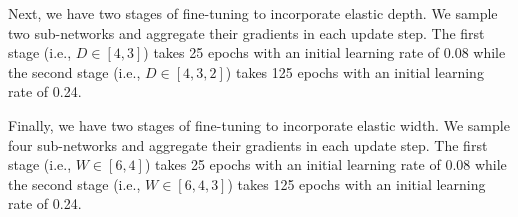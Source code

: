 \documentclass{article} \usepackage{iclr2020_conference,times}
\begin{document}
Next, we have two stages of fine-tuning to incorporate elastic depth. We sample two sub-networks and aggregate their gradients in each update step. The first stage (i.e., $D \in [4, 3]$) takes 25 epochs with an initial learning rate of 0.08 while the second stage (i.e., $D \in [4, 3, 2]$) takes 125 epochs with an initial learning rate of 0.24.

Finally, we have two stages of fine-tuning to incorporate elastic width. We sample four sub-networks and aggregate their gradients in each update step. The first stage (i.e., $W \in [6, 4]$) takes 25 epochs with an initial learning rate of 0.08 while the second stage (i.e., $W \in [6, 4, 3]$) takes 125 epochs with an initial learning rate of 0.24. 
\end{document}
